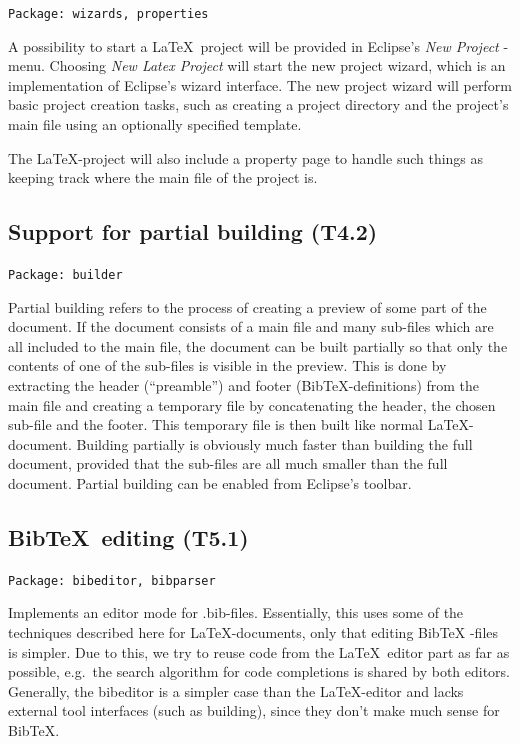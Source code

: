 \documentclass[a4paper,11pt,twoside]{article}
\begin{document}
\texttt{Package: wizards, properties}

A possibility to start a \LaTeX\ project will be provided in Eclipse's 
\emph{New Project} -menu. Choosing \emph{New Latex Project} will start the new 
project wizard, which is an implementation of Eclipse's wizard interface. The 
new project wizard will perform basic project creation tasks, such as creating 
a project directory and the project's main file using an optionally specified 
template.

The \LaTeX -project will also include a property page to handle such things as 
keeping track where the main file of the project is.


\subsection{Support for partial building (T4.2)}

\texttt{Package: builder}

Partial building refers to the process of creating a preview of some part of 
the document. If the document consists of a main file and many sub-files which 
are all included to the main file, the document can be built partially so that 
only the contents of one of the sub-files is visible in the preview. This is 
done by extracting the header (``preamble'') and footer (Bib\TeX -definitions) 
from the main file and creating a temporary file by concatenating the header, 
the chosen sub-file and the footer. This temporary file is then built like 
normal \LaTeX -document. Building partially is obviously much faster than 
building the full document, provided that the sub-files are all much smaller 
than the full document. Partial building can be enabled from Eclipse's toolbar.


\subsection{Bib\TeX\ editing (T5.1)}

\texttt{Package: bibeditor, bibparser}

Implements an editor mode for .bib-files. Essentially, this uses some of the 
techniques described here for \LaTeX -documents, only that editing Bib\TeX 
-files is simpler. Due to this, we try to reuse code from the \LaTeX\ editor 
part as far as possible, e.g.\ the search algorithm for code completions is 
shared by both editors. Generally, the bibeditor is a simpler case than the 
\LaTeX -editor and lacks external tool interfaces (such as building), since 
they don't make much sense for Bib\TeX.
\end{document}
